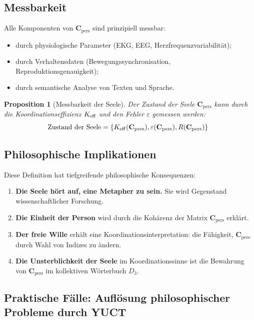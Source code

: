 \documentclass[12pt,a4paper]{article}
\newcommand{\eps}{\varepsilon}
\newcommand{\Cpers}{\mathbf{C}_{\text{pers}}}
\newtheorem{proposition}{Proposition}[section]
\begin{document}
	\subsection{Messbarkeit}
	
	Alle Komponenten von \(\Cpers\) sind prinzipiell messbar:
	\begin{itemize}
		\item durch physiologische Parameter (EKG, EEG, Herzfrequenzvariabilität);
		\item durch Verhaltensdaten (Bewegungssynchronisation, Reproduktionsgenauigkeit);
		\item durch semantische Analyse von Texten und Sprache.
	\end{itemize}
	
	\begin{proposition}[Messbarkeit der Seele]
		Der Zustand der Seele \(\Cpers\) kann durch die Koordinationseffizienz \(\Keff\) und den Fehler \(\eps\) gemessen werden:
		\[
		\text{Zustand der Seele} = \{\Keff(\Cpers), \eps(\Cpers), R(\Cpers)\}
		\]
	\end{proposition}
	
	\subsection{Philosophische Implikationen}
	
	Diese Definition hat tiefgreifende philosophische Konsequenzen:
	
	\begin{enumerate}
		\item \textbf{Die Seele hört auf, eine Metapher zu sein.} Sie wird Gegenstand wissenschaftlicher Forschung.
		\item \textbf{Die Einheit der Person} wird durch die Kohärenz der Matrix \(\Cpers\) erklärt.
		\item \textbf{Der freie Wille} erhält eine Koordinationsinterpretation: die Fähigkeit, \(\Cpers\) durch Wahl von Indizes zu ändern.
		\item \textbf{Die Unsterblichkeit der Seele} im Koordinationssinne ist die Bewahrung von \(\Cpers\) im kollektiven Wörterbuch \(D_3\).
	\end{enumerate}
	
	\subsection{Praktische Fälle: Auflösung philosophischer Probleme durch YUCT}
	\label{sec:practical-cases}
	
\end{document}
